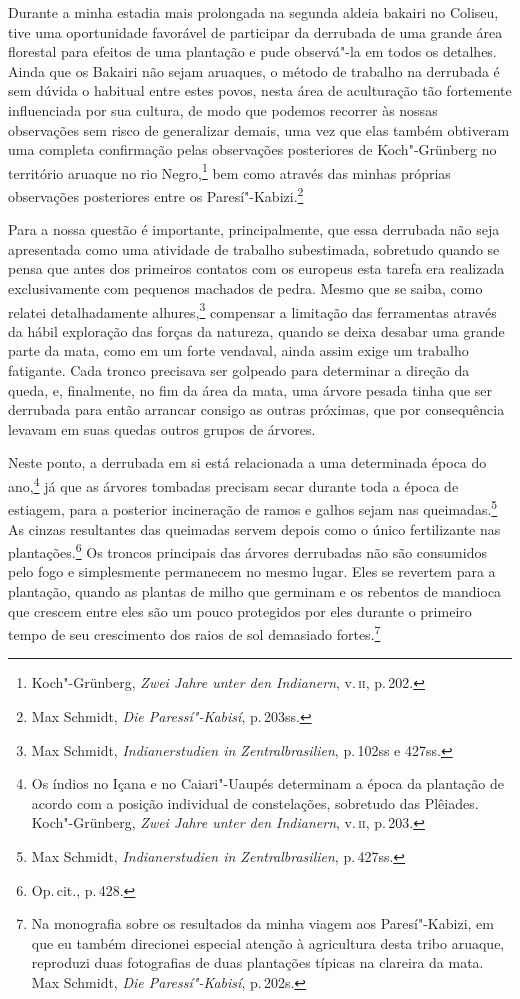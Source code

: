 Durante a minha estadia mais prolongada na segunda aldeia bakairi no
Coliseu, tive uma oportunidade favorável de participar da derrubada de
uma grande área florestal para efeitos de uma plantação e pude
observá"-la em todos os detalhes. Ainda que os Bakairi não sejam aruaques,
o método de trabalho na derrubada é sem dúvida o habitual entre estes povos, 
nesta área de aculturação tão fortemente influenciada por sua cultura, 
de modo que podemos recorrer às nossas observações sem
risco de generalizar demais, uma vez que elas também obtiveram uma
completa confirmação pelas observações posteriores de Koch"-Grünberg no
território aruaque no rio Negro,\footnote{Koch"-Grünberg, \textit{Zwei Jahre
  unter den Indianern}, v.\,\textsc{ii}, p.\,202.} bem como através das
minhas próprias observações posteriores entre os Paresí"-Kabizi.\footnote{Max
  Schmidt, \textit{Die Paressí"-Kabisí}, p.\,203ss.}

Para a nossa questão é importante, principalmente, que essa derrubada
não seja apresentada como uma atividade de trabalho subestimada,
sobretudo quando se pensa que antes dos primeiros contatos com os
europeus esta tarefa era realizada exclusivamente com pequenos machados
de pedra. Mesmo que se saiba, como relatei detalhadamente
alhures,\footnote{Max Schmidt, \textit{Indianerstudien in
  Zentralbrasilien}, p.\,102ss e 427ss.} compensar a limitação das
ferramentas através da hábil exploração das forças da natureza, quando
se deixa desabar uma grande parte da mata, como em um forte vendaval,
ainda assim exige um trabalho fatigante. Cada tronco precisava ser
golpeado para determinar a direção da queda, e, finalmente, no fim da
área da mata, uma árvore pesada tinha que ser derrubada para então arrancar 
consigo as outras próximas, que por consequência levavam
em suas quedas outros grupos de árvores.

Neste ponto, a derrubada em si está relacionada a uma determinada época
do ano,\footnote{Os índios no Içana e no Caiari"-Uaupés determinam a época
  da plantação de acordo com a posição individual de constelações,
  sobretudo das Plêiades. Koch"-Grünberg, \textit{Zwei Jahre unter den
  Indianern}, v.\,\textsc{ii}, p.\,203.} já que as árvores tombadas
precisam secar durante toda a época de estiagem, para a
posterior incineração de ramos e galhos sejam nas
queimadas.\footnote{Max Schmidt, \textit{Indianerstudien in
  Zentralbrasilien}, p.\,427ss.} As cinzas resultantes das queimadas
servem depois como o único fertilizante nas plantações.\footnote{Op.\,cit., p.\,428.} Os troncos principais das árvores derrubadas não são
consumidos pelo fogo e simplesmente permanecem no mesmo lugar. Eles se
revertem para a plantação, quando as plantas de milho que germinam e os
rebentos de mandioca que crescem entre eles são um pouco protegidos
por eles durante o primeiro tempo de seu crescimento dos raios de sol
demasiado fortes.\footnote{Na monografia sobre os resultados da minha viagem aos
Paresí"-Kabizi, em que eu também direcionei especial atenção à
agricultura desta tribo aruaque, reproduzi duas fotografias de duas plantações
típicas na clareira da mata. Max Schmidt, \textit{Die Paressí"-Kabisí}, p.\,202s.}

